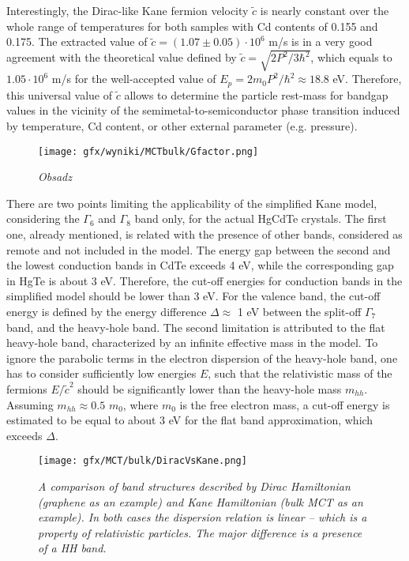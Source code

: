 \documentclass[titlepage,a4paper]{book}
\begin{document}
Interestingly, the Dirac-like Kane fermion velocity $\tilde{c}$ is nearly constant over the whole range of temperatures for both samples with Cd contents of 0.155 and 0.175. The extracted value of $\tilde{c} = (1.07 \pm 0.05)\cdot 10^6$ m/s is in a very good agreement with the theoretical value defined by $\tilde{c} = \sqrt{2 P^2/3\hbar^2}$, which equals to $1.05 \cdot 10^6$ m/s for the well-accepted value of $E_p = 2m_0 P^2/ \hbar^2 \approx 18.8$ eV. Therefore, this universal value of $\tilde{c}$ allows to determine the particle rest-mass for bandgap values in the vicinity of the semimetal-to-semiconductor phase transition induced by temperature, Cd content, or other external parameter (e.g. pressure).

\begin{figure}[ht]
	\centering
	\texttt{[image: gfx/wyniki/MCTbulk/Gfactor.png]}
	\vspace{-10pt}
	\caption{\textit{Obsadz}}
	\label{fig:Bulk_gfactor}
\end{figure}

There are two points limiting the applicability of the simplified Kane model, considering the $\Gamma_6$ and $\Gamma_8$ band only, for the actual HgCdTe crystals. The first one, already mentioned, is related with the presence of other bands, considered as remote and not included in the model. The energy gap between the second and the lowest conduction bands in CdTe exceeds 4 eV, while the corresponding gap in HgTe is about 3 eV. Therefore, the cut-off energies for conduction bands in the simplified model should be lower than 3 eV. For the valence band, the cut-off energy is defined by the energy difference $\Delta \approx$ 1 eV between the split-off $\Gamma_7$ band, and the heavy-hole band. The second limitation is attributed to the flat heavy-hole band, characterized by an infinite effective mass in the model. To ignore the parabolic terms in the electron dispersion of the heavy-hole band, one has to consider sufficiently low energies $E$, such that the relativistic mass of the fermions $E/\tilde{c}^2$ should be significantly lower than the heavy-hole mass $m_{hh}$. Assuming $m_{hh} \approx 0.5$ $m_0$, where $m_0$ is the free electron mass, a cut-off energy is estimated to be equal to about 3 eV for the flat band approximation, which exceeds $\Delta$.
\begin{figure}[ht]
	\centering
	\texttt{[image: gfx/MCT/bulk/DiracVsKane.png]}
	\vspace{-10pt}
	\caption{\textit{A comparison of band structures described by Dirac Hamiltonian (graphene as an example) and Kane Hamiltonian (bulk MCT as an example). In both cases the dispersion relation is linear -- which is a property of relativistic particles. The major difference is a presence of a HH band.}}
	\label{fig:DiracVsKane}
\end{figure}
\end{document}
